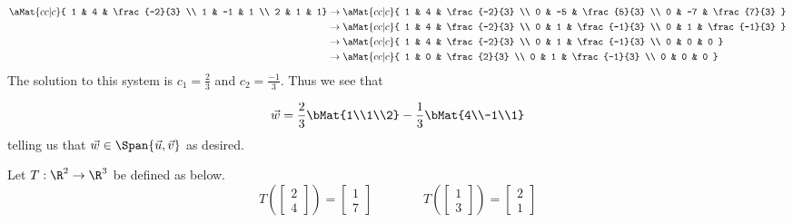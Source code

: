 \documentclass[12pt,addpoints,answers]{exam}
\begin{document}
\begin{questions}
\begin{solution}
            \begin{eqnarray*}
                \aMat{cc|c}{
                    1 & 4 & \frac{-2}{3} \\
                    1 & -1 & 1 \\
                    2 & 1 & 1} &\rightarrow
                \aMat{cc|c}{
                    1 & 4 & \frac{-2}{3} \\
                    0 & -5 & \frac{5}{3} \\
                    0 & -7 & \frac{7}{3}
                }\\
                &\rightarrow\aMat{cc|c}{
                    1 & 4 & \frac{-2}{3} \\
                    0 & 1 & \frac{-1}{3} \\
                    0 & 1 & \frac{-1}{3}
                }\\
                &\rightarrow\aMat{cc|c}{
                    1 & 4 & \frac{-2}{3} \\
                    0 & 1 & \frac{-1}{3} \\
                    0 & 0 & 0
                } \\
                &\rightarrow\aMat{cc|c}{
                    1 & 0 & \frac{2}{3} \\
                    0 & 1 & \frac{-1}{3} \\
                    0 & 0 & 0
                }
            \end{eqnarray*}
            The solution to this system is $c_1=\frac{2}{3}$ and $c_2=\frac{-1}{3}$. Thus we see that

            \[
                \vec{w} = \frac{2}{3} \bMat{1\\1\\2} - \frac{1}{3}\bMat{4\\-1\\1}
            \]
            telling us that $\vec{w}\in\Span{\vec{u},\vec{v}}$ as desired.
        \end{solution}
        \vfill\newpage
        \question Let $T:\R^2\rightarrow\R^3$ be defined as below.
        \[
            T\left(\begin{bmatrix} 2 \\ 4 \end{bmatrix}\right) = \begin{bmatrix} 1 \\ 7 \end{bmatrix}
                \qquad\qquad
            T\left(\begin{bmatrix} 1 \\ 3 \end{bmatrix}\right) = \begin{bmatrix} 2 \\ 1 \end{bmatrix}
        \]
        \begin{parts}

\end{parts}
\end{questions}
\end{document}
